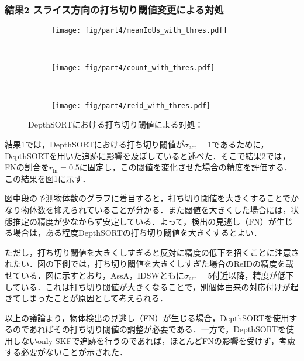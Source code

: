         \subsubsection{結果2 スライス方向の打ち切り閾値変更による対処}

        \begin{figure}[t]
            \begin{subfigure}[t]{\linewidth}
                \centering
                \texttt{[image: fig/part4/meanIoUs\_with\_thres.pdf]}
            \end{subfigure}
            \\
            \begin{subfigure}[t]{\linewidth}
                \centering
                \texttt{[image: fig/part4/count\_with\_thres.pdf]}
            \end{subfigure}
            \\
            \begin{subfigure}[t]{\linewidth}
                \centering
                \texttt{[image: fig/part4/reid\_with\_thres.pdf]}
            \end{subfigure}
            \caption[DepthSORTにおける打ち切り閾値による対処]{DepthSORTにおける打ち切り閾値による対処：}
            \label{fig:handling_with_thres}
        \end{figure}

        結果1では，DepthSORTにおける打ち切り閾値が$\sigma_{\text{act}} = 1$であるために，DepthSORTを用いた追跡に影響を及ぼしていると述べた．そこで結果2では，FNの割合を$r_{\text{fn}} = 0.5$に固定し，この閾値を変化させた場合の精度を評価する．この結果を図\ref{fig:handling_with_thres}に示す．

        図中段の予測物体数のグラフに着目すると，打ち切り閾値を大きくすることでかなり物体数を抑えられていることが分かる．また閾値を大きくした場合には，状態推定の精度が少なからず安定している．よって，検出の見逃し（FN）が生じる場合は，ある程度DepthSORTの打ち切り閾値を大きくするとよい．

        ただし，打ち切り閾値を大きくしすぎると反対に精度の低下を招くことに注意されたい．図の下側では，打ち切り閾値を大きくしすぎた場合のReIDの精度を載せている．図に示すとおり，AssA，IDSWともに$\sigma_{\text{act}} = 5$付近以降，精度が低下している．これは打ち切り閾値が大きくなることで，別個体由来の対応付けが起きてしまったことが原因として考えられる．

        以上の議論より，物体検出の見逃し（FN）が生じる場合，DepthSORTを使用するのであればその打ち切り閾値の調整が必要である．一方で，DepthSORTを使用しないonly SKFで追跡を行うのであれば，ほとんどFNの影響を受けず，考慮する必要がないことが示された．


